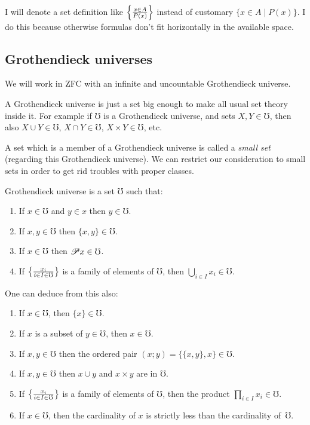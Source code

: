 I will denote a set definition like $\left\{ \frac{x\in A}{P(x)}\right\}$ instead
of customary $\{x\in A\mid P(x)\}$. I do this because otherwise formulas
don't fit horizontally in the available space.


\subsection{Grothendieck universes}

We will work in ZFC with an infinite and uncountable Grothendieck
universe.

A Grothendieck universe is just a set big enough to make all usual
set theory inside it. For example if $\mho$ is a Grothendieck universe,
and sets $X,Y\in\mho$, then also $X\cup Y\in\mho$, $X\cap Y\in\mho$,
$X\times Y\in\mho$, etc.

A set which is a member of a Grothendieck universe
is called a \emph{small set} (regarding this Grothendieck universe).
We can restrict our consideration to small sets in order to get rid
troubles with proper classes.
\begin{defn}
Grothendieck universe is a set $\mho$ such that:
\begin{enumerate}
\item If $x\in\mho$ and $y\in x$ then $y\in\mho$.
\item If $x,y\in\mho$ then $\{x,y\}\in\mho$.
\item If $x\in\mho$ then $\mathscr{P} x\in\mho$.
\item If $\left\{ \frac{x_{i}}{i\in I\in\mho}\right\}$ is a family of elements of $\mho$,
then $\bigcup_{i\in I}x_{i}\in\mho$.
\end{enumerate}
\end{defn}
One can deduce from this also:
\begin{enumerate}
\item If $x\in\mho$, then $\{x\}\in\mho$.
\item If $x$ is a subset of $y\in\mho$, then $x\in\mho$.
\item If $x,y\in\mho$ then the ordered pair $(x;y)=\{\{x,y\},x\}\in\mho$.
\item If $x,y\in\mho$ then $x\cup y$ and $x\times y$ are in $\mho$.
\item If $\left\{ \frac{x_{i}}{i\in I\in\mho}\right\}$ is a family of elements of $\mho$,
then the product $\prod_{i\in I}x_{i}\in\mho$.
\item If $x\in\mho$, then the cardinality of $x$ is strictly less than
the cardinality of~$\mho$.
\end{enumerate}

